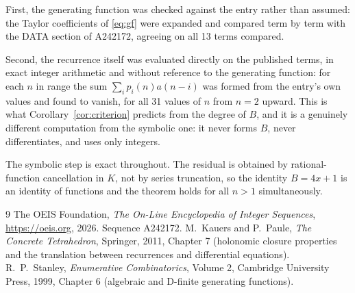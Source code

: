 \documentclass[11pt,a4paper]{article}
\theoremstyle{plain}
\theoremstyle{definition}
\begin{document}
First, the generating function was checked against the entry rather than assumed: the
Taylor coefficients of \eqref{eq:gf} were expanded and compared term by term with the DATA
section of A242172, agreeing on all 13 terms compared.

Second, the recurrence itself was evaluated directly on the published terms, in exact
integer arithmetic and without reference to the generating function: for each $n$ in range
the sum $\sum_{i}p_{i}(n)a(n-i)$ was formed from the entry's own values and found to
vanish, for all 31 values of $n$ from $n=2$ upward. This is what
Corollary~\ref{cor:criterion} predicts from the degree of $B$, and it is a genuinely
different computation from the symbolic one: it never forms $B$, never differentiates, and
uses only integers.

The symbolic step is exact throughout. The residual is obtained by rational-function
cancellation in $K$, not by series truncation, so the identity $B=4 x + 1$ is an
identity of functions and the theorem holds for all $n>1$ simultaneously.

\begin{thebibliography}{9}
 The OEIS Foundation, \emph{The On-Line Encyclopedia of Integer Sequences},
\url{https://oeis.org}, 2026. Sequence A242172.
 M.~Kauers and P.~Paule, \emph{The Concrete Tetrahedron}, Springer, 2011,
Chapter 7 (holonomic closure properties and the translation between recurrences and
differential equations).
 R.~P.~Stanley, \emph{Enumerative Combinatorics}, Volume 2, Cambridge
University Press, 1999, Chapter 6 (algebraic and D-finite generating functions).
\end{thebibliography}
\end{document}
